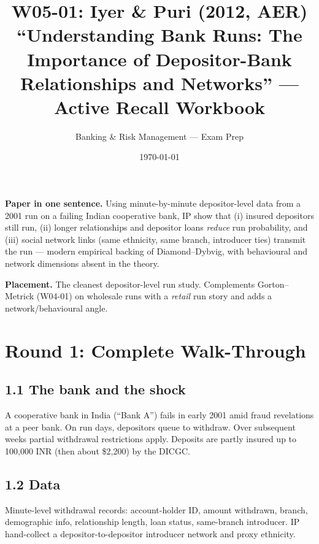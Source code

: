 \documentclass[11pt]{article}
\title{W05-01: Iyer \& Puri (2012, AER) \\
\large ``Understanding Bank Runs: The Importance of Depositor-Bank Relationships and Networks'' --- Active Recall Workbook}
\author{Banking \& Risk Management --- Exam Prep}
\date{\today}
\begin{document}
\maketitle

\begin{keybox}
\textbf{Paper in one sentence.} Using minute-by-minute depositor-level data from a 2001 run on a failing Indian cooperative bank, IP show that (i) insured depositors still run, (ii) longer relationships and depositor loans \emph{reduce} run probability, and (iii) social network links (same ethnicity, same branch, introducer ties) transmit the run --- modern empirical backing of Diamond--Dybvig, with behavioural and network dimensions absent in the theory.

\textbf{Placement.} The cleanest depositor-level run study. Complements Gorton--Metrick (W04-01) on wholesale runs with a \emph{retail} run story and adds a network/behavioural angle.
\end{keybox}

\section*{Round 1: Complete Walk-Through}

\subsection*{1.1 The bank and the shock}
A cooperative bank in India (``Bank A'') fails in early 2001 amid fraud revelations at a peer bank. On run days, depositors queue to withdraw. Over subsequent weeks partial withdrawal restrictions apply. Deposits are partly insured up to 100{,}000 INR (then about \$2{,}200) by the DICGC.

\subsection*{1.2 Data}
Minute-level withdrawal records: account-holder ID, amount withdrawn, branch, demographic info, relationship length, loan status, same-branch introducer. IP hand-collect a depositor-to-depositor introducer network and proxy ethnicity.
\end{document}
